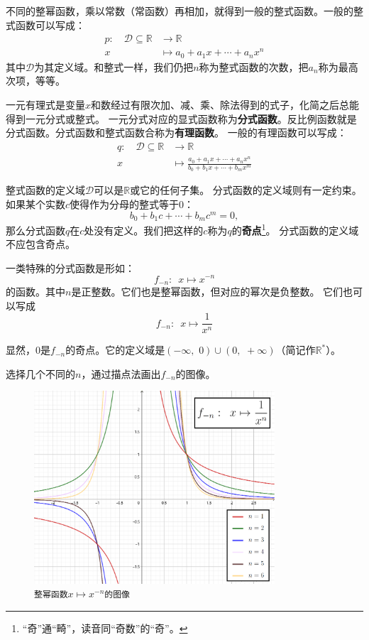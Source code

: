 \documentclass[12pt,UTF8]{ctexbook}
\begin{document}
不同的整幂函数，乘以常数（常函数）再相加，就得到一般的整式函数。一般的整式函数可以写成：
\begin{align*}
    p: \quad \mathcal{D} \subseteq \mathbb{R} &\rightarrow \mathbb{R}  \\
    x &\mapsto a_0 + a_1 x + \cdots + a_n x^n 
\end{align*}
其中$\mathcal{D}$为其定义域。和整式一样，我们仍把$n$称为整式函数的次数，把$a_n$称为最高次项，等等。

一元有理式是变量$x$和数经过有限次加、减、乘、除法得到的式子，化简之后总能得到一元分式或整式。
一元分式对应的显式函数称为\textbf{分式函数}。反比例函数就是分式函数。分式函数和整式函数合称为\textbf{有理函数}。
一般的有理函数可以写成：
\begin{align*}
    q: \quad \mathcal{D} \subseteq \mathbb{R} &\rightarrow \mathbb{R}  \\
    x &\mapsto \frac{a_0 + a_1 x + \cdots + a_n x^n}{b_0 + b_1x + \cdots + b_mx^m} 
\end{align*}

整式函数的定义域$\mathcal{D}$可以是$\mathbb{R}$或它的任何子集。
分式函数的定义域则有一定约束。如果某个实数$c$使得作为分母的整式等于$0$：
$$ b_0 + b_1c + \cdots + b_m c^m = 0, $$
那么分式函数$q$在$c$处没有定义。我们把这样的$c$称为$q$的\textbf{奇点}\footnote{“奇”通“畸”，读音同“奇数”的“奇”。}。
分式函数的定义域不应包含奇点。

一类特殊的分式函数是形如：
$$ f_{-n} : \,\,\, x \mapsto x^{-n}$$
的函数。其中$n$是正整数。它们也是整幂函数，但对应的幂次是负整数。
它们也可以写成
$$ f_{-n} : \,\,\, x \mapsto \frac{1}{x^n}$$

显然，$0$是$f_{-n}$的奇点。它的定义域是$(-\infty,\,\, 0)\cup(0, \,\, +\infty)$（简记作$\mathbb{R}^*$）。

选择几个不同的$n$，通过描点法画出$f_{-n}$的图像。

\begin{figure}[h]
    \vspace{4pt}
    \centering
    \includegraphics[width=0.8\textwidth]{tu/整幂函数2.png}
    \caption*{\texttt{整幂函数}$x\mapsto x^{-n}$\texttt{的图像}}
\end{figure}
\end{document}
